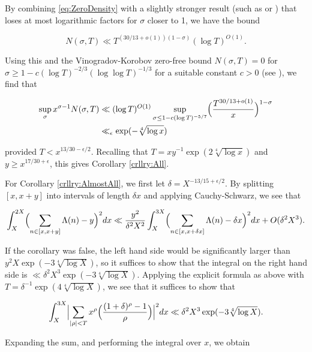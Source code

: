 \documentclass{amsart}
\theoremstyle{plain}
\numberwithin{equation}{section}
\begin{document}
By combining \eqref{eq:ZeroDensity} with a slightly stronger result (such as \cite{J} or \cite[Theorem 12.1]{M3}) that loses at most logarithmic factors for $\sigma$ closer to 1, we have the bound

\begin{equation}
N(\sigma,T)\ll T^{(30/13+o(1))(1-\sigma)}(\log{T})^{O(1)}.
\end{equation}

Using this and the Vinogradov-Korobov zero-free bound $N(\sigma,T)=0$ for $\sigma \ge 1-c(\log{T})^{-2/3}(\log\log{T})^{-1/3}$ for a suitable constant $c>0$ (see \cite[Corollary 11.4]{M3}), we find that

\begin{align*}
 \sup_{\sigma}x^{\sigma-1} N(\sigma,T) &\ll (\log{T})^{O(1)} \sup_{\sigma \le 1-c(\log{T})^{-5/7}}\Bigl(\frac{T^{30/13+o(1)}}{x}\Bigr)^{1-\sigma}\\
 &\ll_\epsilon \exp(-\sqrt[4]{\log{x}})
\end{align*}

provided $T<x^{13/30-\epsilon/2}$. Recalling that $T=xy^{-1}\exp(2\sqrt[4]{\log{x}})$ and $y\ge x^{17/30+\epsilon}$, this gives Corollary \ref{crllry:All}.

For Corollary \ref{crllry:AlmostAll}, we first let $\delta=X^{-13/15+\epsilon/2}$. By splitting $[x,x+y]$ into intervals of length $\delta x$ and applying Cauchy-Schwarz, we see that

\begin{align*}
\int_{X}^{2X}\Bigl(\sum_{n\in [x,x+y]}\Lambda(n)-y\Bigr)^2 dx\ll  \frac{y^2}{\delta^2 X^2}\int_{X}^{3X}\Bigl(\sum_{n\in [x,x+\delta x]}\Lambda(n)-\delta x\Bigr)^2dx+O(\delta^2 X^{3}).
\end{align*}

If the corollary was false, the left hand side would be significantly larger than $y^2 X\exp(-3\sqrt[4]{\log{X}})$, so it suffices to show that the integral on the right hand side is $\ll \delta^2 X^3\exp(-3\sqrt[4]{\log{X}})$. Applying the explicit formula as above with $T=\delta^{-1}\exp(4\sqrt[4]{\log{X}})$, we see that it suffices to show that

\begin{equation}
\int_X^{3X} \Bigl| \sum_{|\rho|<T}x^\rho\Bigl(\frac{(1+\delta)^\rho-1}{\rho}\Bigr)\Bigr|^2dx\ll \delta^2 X^3 \exp(-3\sqrt[4]{\log{X}}).
\label{eq:AlmostAllTarget}
\end{equation}

Expanding the sum, and performing the integral over $x$, we obtain
\end{document}
